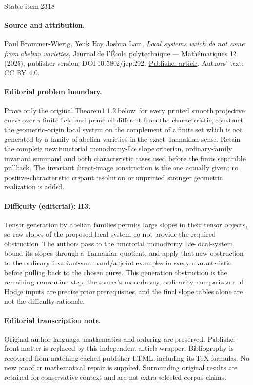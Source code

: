 \documentclass[11pt]{article}
\numberwithin{equation}{subsection}
\theoremstyle{definition}
\begin{document}
\begin{center}{\Large Stable item 2318}\end{center}
\paragraph{Source and attribution.}
Paul Brommer-Wierig, Yeuk Hay Joshua Lam, \emph{Local systems which do not come from abelian varieties}, Journal de l’École polytechnique — Mathématiques 12 (2025), publisher version, DOI 10.5802/jep.292. \href{https://jep.centre-mersenne.org/articles/10.5802/jep.292/}{Publisher article}. Authors' text: \href{https://creativecommons.org/licenses/by/4.0/}{CC BY 4.0}.
\paragraph{Editorial problem boundary.}
Prove only the original Theorem1.1.2 below: for every printed smooth projective curve over a finite field and prime ell different from the characteristic, construct the geometric-origin local system on the complement of a finite set which is not generated by a family of abelian varieties in the exact Tannakian sense. Retain the complete new functorial monodromy-Lie slope criterion, ordinary-family invariant summand and both characteristic cases used before the finite separable pullback. The invariant direct-image construction is the one actually given; no positive-characteristic crepant resolution or unprinted stronger geometric realization is added.
\paragraph{Difficulty (editorial): H3.}
Tensor generation by abelian families permits large slopes in their tensor objects, so raw slopes of the proposed local system do not provide the required obstruction. The authors pass to the functorial monodromy Lie-local-system, bound its slopes through a Tannakian quotient, and apply that new obstruction to the ordinary invariant-summand/adjoint examples in every characteristic before pulling back to the chosen curve. This generation obstruction is the remaining nonroutine step; the source's monodromy, ordinarity, comparison and Hodge inputs are precise prior prerequisites, and the final slope tables alone are not the difficulty rationale.
\paragraph{Editorial transcription note.}
Original author language, mathematics and ordering are preserved. Publisher front matter is replaced by this independent article wrapper. Bibliography is recovered from matching cached publisher HTML, including its TeX formulas. No new proof or mathematical repair is supplied. Surrounding original results are retained for conservative context and are not extra selected corpus claims.
\clearpage
\end{document}
